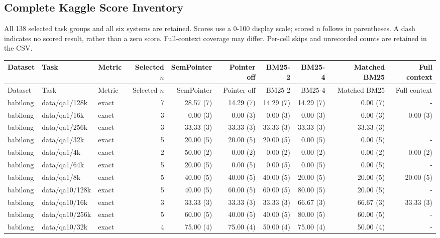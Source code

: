 \clearpage\appendix\begin{landscape}
\section{Complete Kaggle Score Inventory}
All 138 selected task groups and all six systems are retained. Scores use a 0-100 display scale; scored n follows in parentheses. A dash indicates no scored result, rather than a zero score. Full-context coverage may differ. Per-cell skips and unrecorded counts are retained in the CSV.


\begingroup\scriptsize\setlength{\tabcolsep}{3pt}
\begin{longtable}{@{}p{19mm}p{52mm}p{25mm}rrrrrrr@{}}
\toprule Dataset & Task & Metric & Selected $n$ & SemPointer & Pointer off & BM25-2 & BM25-4 & Matched BM25 & Full context \\ \midrule\endfirsthead
\toprule Dataset & Task & Metric & Selected $n$ & SemPointer & Pointer off & BM25-2 & BM25-4 & Matched BM25 & Full context \\ \midrule\endhead
\bottomrule\endfoot
babilong & data/qa1/128k & exact & 7 & 28.57 (7) & 14.29 (7) & 14.29 (7) & 14.29 (7) & 0.00 (7) & - \\
babilong & data/qa1/16k & exact & 3 & 0.00 (3) & 0.00 (3) & 0.00 (3) & 0.00 (3) & 0.00 (3) & 0.00 (3) \\
babilong & data/qa1/256k & exact & 3 & 33.33 (3) & 33.33 (3) & 33.33 (3) & 33.33 (3) & 33.33 (3) & - \\
babilong & data/qa1/32k & exact & 5 & 20.00 (5) & 20.00 (5) & 20.00 (5) & 0.00 (5) & 0.00 (5) & - \\
babilong & data/qa1/4k & exact & 2 & 50.00 (2) & 0.00 (2) & 0.00 (2) & 0.00 (2) & 0.00 (2) & 0.00 (2) \\
babilong & data/qa1/64k & exact & 5 & 20.00 (5) & 0.00 (5) & 0.00 (5) & 0.00 (5) & 0.00 (5) & - \\
babilong & data/qa1/8k & exact & 5 & 40.00 (5) & 40.00 (5) & 40.00 (5) & 20.00 (5) & 20.00 (5) & 20.00 (5) \\
babilong & data/qa10/128k & exact & 5 & 40.00 (5) & 60.00 (5) & 60.00 (5) & 80.00 (5) & 20.00 (5) & - \\
babilong & data/qa10/16k & exact & 3 & 33.33 (3) & 33.33 (3) & 33.33 (3) & 66.67 (3) & 66.67 (3) & 33.33 (3) \\
babilong & data/qa10/256k & exact & 5 & 60.00 (5) & 40.00 (5) & 40.00 (5) & 80.00 (5) & 60.00 (5) & - \\
babilong & data/qa10/32k & exact & 4 & 75.00 (4) & 75.00 (4) & 50.00 (4) & 75.00 (4) & 50.00 (4) & - \\

\end{longtable}
\end{landscape}
